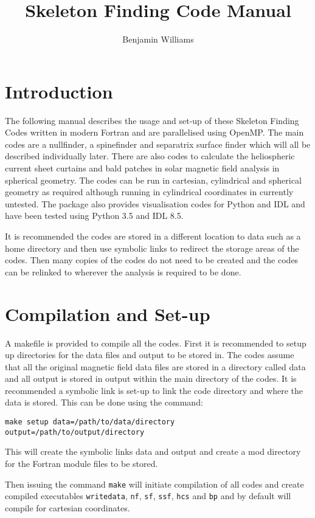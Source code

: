 \documentclass[12pt]{article}
\author{Benjamin Williams}
\title{Skeleton Finding Code Manual}
\begin{document}
  \maketitle

  \section{Introduction}

    The following manual describes the usage and set-up of these Skeleton Finding Codes written in modern Fortran and are parallelised using OpenMP. The main codes are a nullfinder, a spinefinder and separatrix surface finder which will all be described individually later. There are also codes to calculate the heliospheric current sheet curtains and bald patches in solar magnetic field analysis in spherical geometry. The codes can be run in cartesian, cylindrical and spherical geometry as required although running in cylindrical coordinates in currently untested. The package also provides visualisation codes for Python and IDL and have been tested using Python 3.5 and IDL 8.5.
    
    It is recommended the codes are stored in a different location to data such as a home directory and then use symbolic links to redirect the storage areas of the codes. Then many copies of the codes do not need to be created and the codes can be relinked to wherever the analysis is required to be done. 

    \section{Compilation and Set-up}

    A makefile is provided to compile all the codes. First it is recommended to setup up directories for the data files and output to be stored in. The codes assume that all the original magnetic field data files are stored in a directory called data and all output is stored in output within the main directory of the codes. It is recommended a symbolic link is set-up to link the code directory and where the data is stored. This can be done using the command:

    \texttt{make setup data=/path/to/data/directory output=/path/to/output/directory}

    This will create the symbolic links data and output and create a mod directory for the Fortran module files to be stored.

    Then issuing the command \texttt{make} will initiate compilation of all codes and create compiled executables \texttt{writedata}, \texttt{nf}, \texttt{sf}, \texttt{ssf}, \texttt{hcs} and \texttt{bp} and by default will compile for cartesian coordinates.
\end{document}
